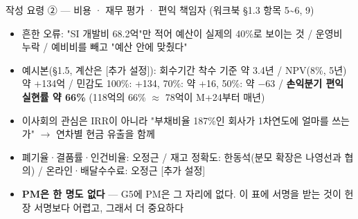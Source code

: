 \begin{frame}[allowframebreaks=1.0]{작성 요령 ② — 비용 · 재무 평가 · 편익 책임자 (워크북 §1.3 항목 5\textasciitilde{}6, 9)}
\small
\par\smallskip{}\nobreak
\begin{itemize}
\item\relax 흔한 오류: "SI 개발비 68.2억"만 적어 예산이 실제의 40\%로 보이는 것 / 운영비 누락 / 예비비를 빼고 "예산 안에 맞췄다"
\end{itemize}
\par\smallskip{}\nobreak
\begin{itemize}
\item\relax 예시본(§1.5, 계산은 [추가 설정]): 회수기간 착수 기준 약 3.4년 / NPV(8\%, 5년) 약 +134억 / 민감도 100\%: +134, 70\%: 약 +16, 50\%: 약 $-$63 / \textbf{손익분기 편익 실현률 약 66\%} (118억의 66\% $\approx$ 78억이 M+24부터 매년)
\item\relax 이사회의 관심은 IRR이 아니라 "부채비율 187\%인 회사가 1차연도에 얼마를 쓰는가" $\rightarrow$ 연차별 현금 유출을 함께
\end{itemize}
\par\smallskip{}\nobreak
\begin{itemize}
\item\relax 폐기율·결품률·인건비율: 오정근 / 재고 정확도: 한동석(분모 확장은 나영선과 협의) / 온라인·배달수수료: 오정근 [추가 설정]
\item\relax \textbf{PM은 한 명도 없다} — G5에 PM은 그 자리에 없다. 이 표에 서명을 받는 것이 헌장 서명보다 어렵고, 그래서 더 중요하다
\end{itemize}
\end{frame}

